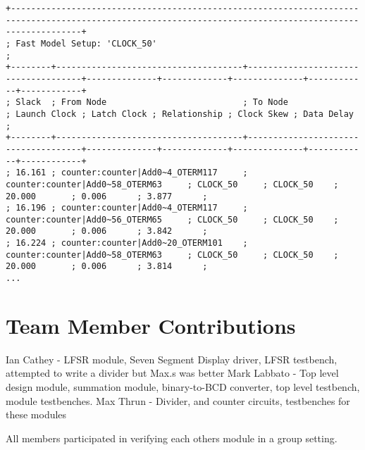 \documentclass[12pt]{article}
\begin{document}
\begin{verbatim}
+----------------------------------------------------------------------------------------------------------------------------------------------------------+
; Fast Model Setup: 'CLOCK_50'                                                                                                                             ;
+--------+-------------------------------------+-------------------------------------+--------------+-------------+--------------+------------+------------+
; Slack  ; From Node                           ; To Node                             ; Launch Clock ; Latch Clock ; Relationship ; Clock Skew ; Data Delay ;
+--------+-------------------------------------+-------------------------------------+--------------+-------------+--------------+------------+------------+
; 16.161 ; counter:counter|Add0~4_OTERM117     ; counter:counter|Add0~58_OTERM63     ; CLOCK_50     ; CLOCK_50    ; 20.000       ; 0.006      ; 3.877      ;
; 16.196 ; counter:counter|Add0~4_OTERM117     ; counter:counter|Add0~56_OTERM65     ; CLOCK_50     ; CLOCK_50    ; 20.000       ; 0.006      ; 3.842      ;
; 16.224 ; counter:counter|Add0~20_OTERM101    ; counter:counter|Add0~58_OTERM63     ; CLOCK_50     ; CLOCK_50    ; 20.000       ; 0.006      ; 3.814      ;
...
\end{verbatim}

\section*{Team Member Contributions}
Ian Cathey - LFSR module, Seven Segment Display driver, LFSR testbench, attempted to write a divider but Max.s was better
Mark Labbato - Top level design module, summation module, binary-to-BCD converter, top level testbench, module testbenches.
Max Thrun - Divider, and counter circuits, testbenches for these modules


All members participated in verifying each others module in a group setting.
\end{document}
